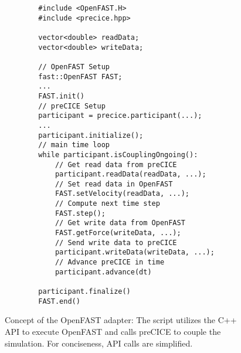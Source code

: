 \begin{figure}[h!]
	\centering
	\begin{minipage}{0.9\textwidth}
		\begin{verbatim}
		#include <OpenFAST.H>
		#include <precice.hpp>
		
		vector<double> readData;
		vector<double> writeData;
		
		// OpenFAST Setup
		fast::OpenFAST FAST;
		...
		FAST.init()
		// preCICE Setup
		participant = precice.participant(...);
		...
		participant.initialize();
		// main time loop
		while participant.isCouplingOngoing(): 
			// Get read data from preCICE
			participant.readData(readData, ...);
			// Set read data in OpenFAST
			FAST.setVelocity(readData, ...);
			// Compute next time step
			FAST.step();
			// Get write data from OpenFAST
			FAST.getForce(writeData, ...);
			// Send write data to preCICE
			participant.writeData(writeData, ...);
			// Advance preCICE in time
			participant.advance(dt) 
		
		participant.finalize()
		FAST.end()
		\end{verbatim}
	\end{minipage}
	\caption{Concept of the OpenFAST adapter: The script utilizes the C++ API to execute OpenFAST and calls preCICE to couple the simulation. For conciseness, API calls are simplified.}
	\label{code:adapter}
\end{figure}
